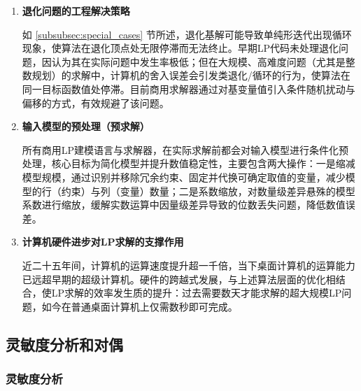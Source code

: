 \documentclass[12pt]{article}
\theoremstyle{plain}
\theoremstyle{definition}
\begin{document}
\begin{enumerate}
    内点算法与单纯形法的迭代逻辑完全不同，其不沿可行域的顶点迭代，而是穿越可行域内部，逐步收敛至最优解，且算法的计算复杂度为问题规模的多项式级，而单纯形法的理论复杂度为指数级（存在构造性例子中，单纯形法需遍历所有顶点才能找到最优解）。内点算法于1984年被提出后，经发展形成了多种变体的障碍算法，其核心优势为对超大规模LP问题的求解速度显著快于最优的对偶单纯形法；但该算法的固有缺陷为不生成顶点解，这使其在需要频繁获取顶点解的事后优化分析与整数规划中应用受限，即便目前已开发出将内点算法的最优内点解转换为顶点解的方法，也因附加计算量过大而难以实用。因此，商用LP求解器均将障碍算法作为补充工具，专门用于求解大规模线性规划问题，与单纯形法形成互补。

    \item \textbf{退化问题的工程解决策略}
    
    如 \ref{subsubsec:special_cases} 节所述，退化基解可能导致单纯形迭代出现循环现象，使算法在退化顶点处无限停滞而无法终止。早期LP代码未处理退化问题，因认为其在实际问题中发生率极低；但在大规模、高难度问题（尤其是整数规划）的求解中，计算机的舍入误差会引发类退化/循环的行为，使算法在同一目标函数值处停滞。目前商用求解器通过对基变量值引入条件随机扰动与偏移的方式，有效规避了该问题。

    \item \textbf{输入模型的预处理（预求解）}
    
    所有商用LP建模语言与求解器，在实际求解前都会对输入模型进行条件化预处理，核心目标为简化模型并提升数值稳定性，主要包含两大操作：一是缩减模型规模，通过识别并移除冗余约束、固定并代换可确定取值的变量，减少模型的行（约束）与列（变量）数量；二是系数缩放，对数量级差异悬殊的模型系数进行缩放，缓解实数运算中因量级差异导致的位数丢失问题，降低数值误差。

    \item \textbf{计算机硬件进步对LP求解的支撑作用}
    
    近二十五年间，计算机的运算速度提升超一千倍，当下桌面计算机的运算能力已远超早期的超级计算机。硬件的跨越式发展，与上述算法层面的优化相结合，使LP求解的效率发生质的提升：过去需要数天才能求解的超大规模LP问题，如今在普通桌面计算机上仅需数秒即可完成。
\end{enumerate}

\subsection{灵敏度分析和对偶}\label{subsec:sensitivity_and_duality}

\subsubsection{灵敏度分析}\label{subsubsec:sensitivity_analysis}
\end{document}
